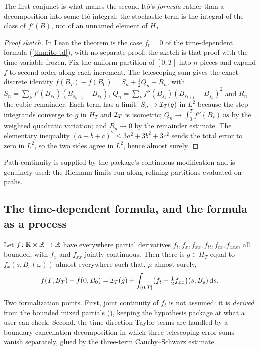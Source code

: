 \documentclass[11pt]{article}
\newcommand{\HT}{H_T}
\begin{document}
The first conjunct is what makes the second It\^o's \emph{formula} rather than a decomposition into some
It\^o integral: the stochastic term is the integral of the class of $f'(B)$, not of an unnamed element of
$\HT$.

\begin{proof}[Proof sketch]
In Lean the theorem is the case $f_t=0$ of the time-dependent formula (\cref{thm:ito-td}), with no separate proof; the
sketch is that proof with the time variable frozen. Fix the uniform partition of $[0,T]$ into $n$ pieces and expand $f$
to second order along each increment.
The telescoping sum gives the exact discrete identity $f(B_T)-f(B_0)=S_n+\frac12Q_n+R_n$, with
$S_n=\sum_kf'(B_{s_k})(B_{s_{k+1}}-B_{s_k})$, $Q_n=\sum_kf''(B_{s_k})(B_{s_{k+1}}-B_{s_k})^2$ and $R_n$ the cubic
remainder. Each term has a limit: $S_n\to\mathcal{I}_T(g)$ in $L^2$ because the step integrands converge to $g$ in
$\HT$ and $\mathcal{I}_T$ is isometric; $Q_n\to\int_0^Tf''(B_s)\,\dd s$ by the weighted quadratic variation; and
$R_n\to0$ by the remainder estimate. The elementary inequality $(a+b+c)^2\le3a^2+3b^2+3c^2$ sends the total
error to zero in $L^2$, so the two sides agree in $L^2$, hence almost surely.
\end{proof}

Path continuity is supplied by the package's continuous modification and is genuinely used: the Riemann
limits run along refining partitions evaluated on paths.

\subsection{The time-dependent formula, and the formula as a process}

\begin{theorem}\label{thm:ito-td}
Let $f\colon\mathbb{R}\times\mathbb{R}\to\mathbb{R}$ have everywhere partial derivatives $f_t,f_x,f_{xx},f_{tt},f_{tx},f_{xxx}$, all
bounded, with $f_x$ and $f_{xx}$ jointly continuous. Then there is $g\in\HT$ equal to
$f_x(s,B_s(\omega))$ almost everywhere such that, $\mu$-almost surely,
\[
  f(T,B_T)-f(0,B_0)=\mathcal{I}_T(g)+\int_{(0,T]}\bigl(f_t+\tfrac12f_{xx}\bigr)(s,B_s)\,\mathrm{d} s .
\]
\end{theorem}

Two formalization points. First, joint continuity of $f_t$ is not assumed: it is \emph{derived} from the
bounded mixed partials (), keeping the hypothesis package at what a
user can check. Second, the time-direction Taylor terms are handled by a boundary-cancellation decomposition
in which three telescoping error sums vanish separately, glued by the three-term Cauchy--Schwarz estimate.
\end{document}
